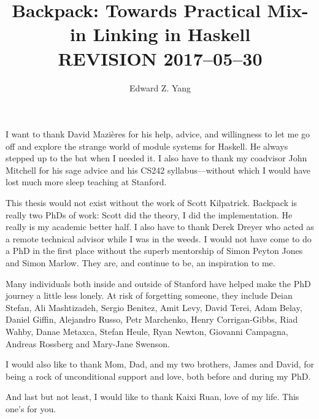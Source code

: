 \documentclass{report}
\begin{document}
\title{Backpack: Towards Practical Mix-in Linking in Haskell \\ REVISION 2017--05--30}
\author{Edward Z. Yang}

\beforepreface%
    I want to thank David Mazi\`eres for his help, advice, and
    willingness to let me go off and explore the strange world
    of module systems for Haskell.  He always stepped up to the bat
    when I needed it.  I also have to thank my coadvisor John
    Mitchell for his sage advice and his CS242 syllabus---without
    which I would have lost much more sleep teaching at Stanford.

    This thesis would not exist without the work of Scott Kilpatrick.
    Backpack is really two PhDs of work: Scott did the theory, I did the
    implementation.  He really is my academic better half.  I also have
    to thank Derek Dreyer who acted as a remote technical advisor
    while I was in the weeds.
    I would not have come to do a PhD in the first place without the
    superb mentorship of Simon Peyton Jones and Simon Marlow.  They are,
    and continue to be, an inspiration to me.

    Many individuals both inside and outside of Stanford have helped
    make the PhD journey a little less lonely.  At risk of forgetting
    someone, they include Deian Stefan, Ali Mashtizadeh, Sergio Benitez,
    Amit Levy, David Terei, Adam Belay, Daniel Giffin, Alejandro Russo,
    Petr Marchenko, Henry Corrigan-Gibbs, Riad Wahby, Danae Metaxca,
    Stefan Heule, Ryan Newton, Giovanni Campagna, Andreas Rossberg and
    Mary-Jane Swenson.

    I would also like to thank Mom, Dad, and my two brothers, James
    and David, for being a rock of unconditional support and love,
    both before and during my PhD.

    And last but not least, I would like to thank Kaixi Ruan, love
    of my life.  This one's for you.
\afterpreface%
















\end{document}
